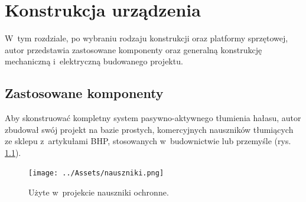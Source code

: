 \chapter{Konstrukcja urządzenia}
\label{cha:constr}
W~tym rozdziale, po wybraniu rodzaju konstrukcji oraz platformy sprzętowej, autor przedstawia zastosowane komponenty oraz generalną konstrukcję mechaniczną  i~elektryczną budowanego projektu.
\section{Zastosowane komponenty}
\label{sec:komponenty}
Aby skonstruować kompletny system pasywno-aktywnego tłumienia hałasu, autor zbudował swój projekt na bazie prostych, komercyjnych nauszników tłumiących ze sklepu z~artykułami BHP, stosowanych w~budownictwie lub przemyśle (rys. \ref{fig:nauszniki}).
\begin{figure}[h!]
	\centering
	\texttt{[image: ../Assets/nauszniki.png]}
	\caption{Użyte w~projekcie nauszniki ochronne.}
	\label{fig:nauszniki}
\end{figure}

